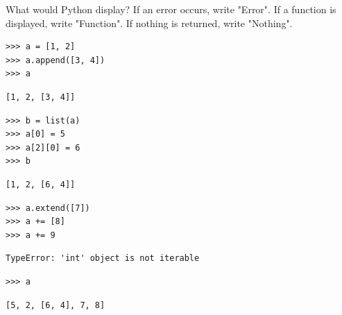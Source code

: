 \begin{blocksection}
\question What would Python display? If an error occurs, write "Error". If a function is displayed, write "Function". If nothing is returned, write "Nothing".

\begin{lstlisting}
>>> a = [1, 2]
>>> a.append([3, 4])
>>> a
\end{lstlisting}
\begin{solution}[0.25in]
\begin{lstlisting}
[1, 2, [3, 4]]
\end{lstlisting}
\end{solution}
\end{blocksection}

\begin{lstlisting}
>>> b = list(a)
>>> a[0] = 5
>>> a[2][0] = 6
>>> b
\end{lstlisting}
\begin{solution}[0.25in]
\begin{lstlisting}
[1, 2, [6, 4]]
\end{lstlisting}
\end{solution}

\begin{lstlisting}
>>> a.extend([7])
>>> a += [8]
>>> a += 9
\end{lstlisting}
\begin{solution}[0.25in]
\begin{lstlisting}
TypeError: 'int' object is not iterable
\end{lstlisting}
\end{solution}

\begin{lstlisting}
>>> a
\end{lstlisting}
\begin{solution}[0.25in]
\begin{lstlisting}
[5, 2, [6, 4], 7, 8]
\end{lstlisting}
\end{solution}

